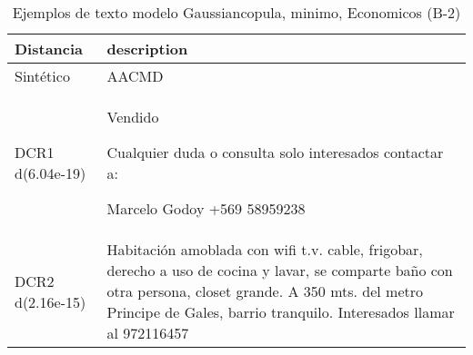 \begin{table}[H]
\centering
\fontsize{10}{14}\selectfont
\caption{Ejemplos de texto modelo Gaussiancopula, minimo, Economicos (B-2)}
\label{table-example-economicos-b-2-gaussiancopula-min-text}
\begin{tabular}{|l|m{35em}|}
\hline
\rowcolor[gray]{0.8}
Distancia & description \\
\hline Sintético & AACMD \\
\hline DCR1 d(6.04e-19) & Vendido

Cualquier duda o consulta solo interesados contactar a:

Marcelo Godoy
+569 58959238
 \\
\hline DCR2 d(2.16e-15) & Habitaci\'on amoblada con wifi t.v. cable, frigobar, derecho a uso de cocina y lavar, se comparte ba\~no con otra persona, closet grande. A 350 mts. del metro Principe de Gales, barrio tranquilo. Interesados llamar al 972116457 \\
\hline
\end{tabular}
\end{table}
